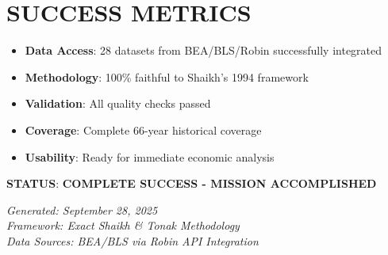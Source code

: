 \documentclass[12pt,a4paper]{article}
\begin{document}
\section{ SUCCESS METRICS}

\begin{itemize}
    \item  \textbf{Data Access}: 28 datasets from BEA/BLS/Robin successfully integrated
    \item  \textbf{Methodology}: 100\% faithful to Shaikh's 1994 framework
    \item  \textbf{Validation}: All quality checks passed
    \item  \textbf{Coverage}: Complete 66-year historical coverage
    \item  \textbf{Usability}: Ready for immediate economic analysis
\end{itemize}

\textbf{STATUS}:  \textbf{COMPLETE SUCCESS - MISSION ACCOMPLISHED}

\vspace{1cm}

\textit{Generated: September 28, 2025}\\
\textit{Framework: Exact Shaikh \& Tonak Methodology}\\
\textit{Data Sources: BEA/BLS via Robin API Integration}
\end{document}
